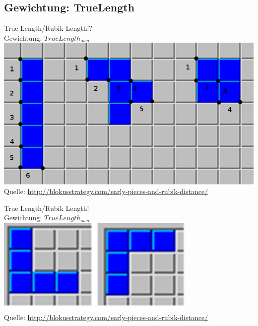 \documentclass[12pt]{beamer}
\begin{document}
\subsection{Gewichtung: TrueLength}
\begin{frame}
	True Length/Rubik Length!?\\
	\pause
	Gewichtung: $TrueLength_{own}$\\
	\pause
	\includegraphics[width=0.8\linewidth]{media/wgh6.png}\\
	\tiny Quelle: \url{http://blokusstrategy.com/early-pieces-and-rubik-distance/}
\end{frame}
\begin{frame}
	True Length/Rubik Length!\\
	Gewichtung: $TrueLength_{own}$\\
	\includegraphics[width=0.8\linewidth]{media/wgh7.png}\\
	\tiny Quelle: \url{http://blokusstrategy.com/early-pieces-and-rubik-distance/}
\end{frame}
\end{document}
